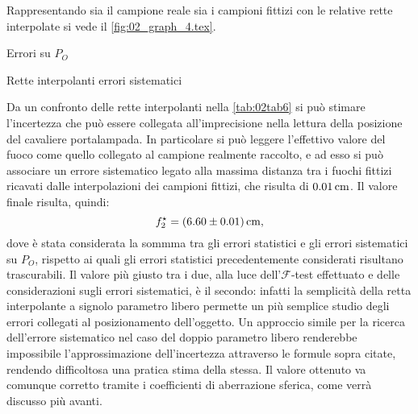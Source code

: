 Rappresentando sia il campione reale sia i campioni fittizi con le relative rette interpolate si vede il 
\autoref{fig:02_graph_4.tex}.
\begin{grafico} \centering  \caption{Errori su $P_O$} \label{fig:02_graph_4.tex} \end{grafico}
\begin{tabella}
	\centering
	
	\caption{Rette interpolanti errori sistematici}
	\label{tab:02tab6}
\end{tabella}
Da un confronto delle rette interpolanti nella \autoref{tab:02tab6} si può stimare l'incertezza che
 può essere collegata all'imprecisione nella lettura della
 posizione del cavaliere portalampada. In particolare si può leggere l'effettivo valore del fuoco come quello collegato al
 campione realmente raccolto, e ad esso si può associare un errore sistematico legato alla massima distanza tra i fuochi fittizi
 ricavati dalle interpolazioni dei campioni fittizi, che risulta di $0.01\,\mathrm{cm}$. Il valore finale risulta, quindi:
 \[f^{\star}_2 = (6.60 \pm 0.01) \,\mathrm{cm},\]
 dove è stata considerata la sommma tra gli errori statistici e gli errori sistematici su $P_O$, rispetto ai quali gli
 errori statistici precedentemente considerati risultano trascurabili.
 Il valore più giusto tra i due, alla luce dell'$\mathcal{F}$-test effettuato e delle considerazioni sugli errori sistematici, è il secondo:
 infatti la semplicità della retta interpolante a signolo parametro libero permette un più semplice studio degli errori collegati
 al posizionamento dell'oggetto. Un approccio simile per la ricerca dell'errore sistematico nel caso del doppio parametro libero
 renderebbe impossibile l'approssimazione dell'incertezza attraverso le formule sopra citate, rendendo difficoltosa una pratica stima
 della stessa. Il valore ottenuto va comunque corretto tramite i coefficienti di aberrazione sferica, come verrà discusso più avanti.
